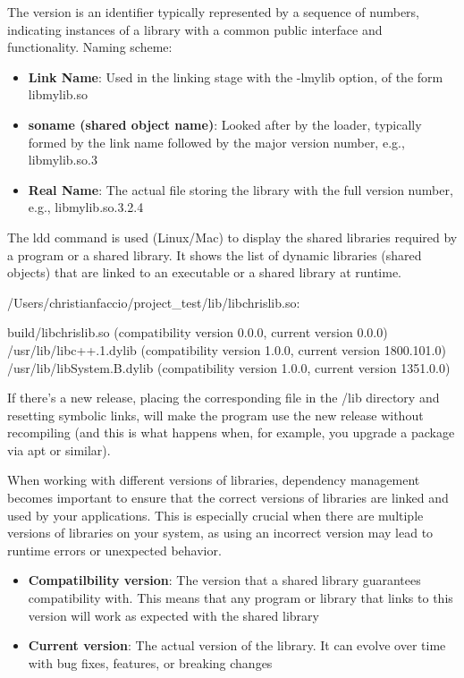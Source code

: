 The version is an identifier typically represented by a sequence of numbers, indicating instances
of a library with a common public interface and functionality. 
Naming scheme:
\begin{itemize}
    \item \textbf{Link Name}: Used in the linking stage with the -lmylib option, of the form libmylib.so 
    \item \textbf{soname (shared object name)}: Looked after by the loader, typically formed by the link
    name followed by the major version number, e.g., libmylib.so.3 
    \item \textbf{Real Name}: The actual file storing the library with the full version number, e.g.,
    libmylib.so.3.2.4
\end{itemize}

The ldd command is used (Linux/Mac) to display the shared libraries required by a program or a shared library. It shows the list of dynamic libraries (shared objects) that are linked to an executable or a shared library at runtime.

\begin{codeblock}[language=bash]
/Users/christianfaccio/project_test/lib/libchrislib.so:
\end{codeblock}
\begin{codeblock}[language=bash]
build/libchrislib.so (compatibility version 0.0.0, current version 0.0.0)
/usr/lib/libc++.1.dylib (compatibility version 1.0.0, current version 1800.101.0)
/usr/lib/libSystem.B.dylib (compatibility version 1.0.0, current version 1351.0.0)
\end{codeblock}

If there's a new release, placing the corresponding file in the /lib directory and resetting symbolic links, will make the program use the new release without recompiling (and this is what happens when, for example, you upgrade a package via apt or similar).

When working with different versions of libraries, dependency management becomes important to ensure that the correct versions of libraries are linked and used by your applications. This is especially crucial when there are multiple versions of libraries on your system, as using an incorrect version may lead to runtime errors or unexpected behavior.

\begin{itemize}
    \item \textbf{Compatilbility version}: The version that a shared library guarantees compatibility with. This means that any program or library that links to this version will work as expected with the shared library
    \item \textbf{Current version}: The actual version of the library. It can evolve over time with bug fixes, features, or breaking changes
\end{itemize}


